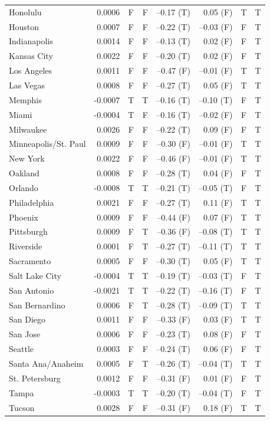\documentclass[
  12pt,
]{interact}
\begin{document}
\begin{table}
{{\begin{tabular}{lrccrrcc}
Honolulu & 0.0006 & F & F & --0.17 (T) & 0.05 (F) & T & T\\
Houston & 0.0007 & F & F & --0.22 (T) & --0.03 (F) & F & T\\
Indianapolis & 0.0014 & F & F & --0.13 (T) & 0.02 (F) & F & T\\
\addlinespace
Kansas City & 0.0022 & F & F & --0.20 (T) & 0.02 (F) & F & T\\
Los Angeles & 0.0011 & F & F & --0.47 (F) & --0.01 (F) & T & T\\
Las Vegas & 0.0008 & F & F & --0.27 (T) & 0.05 (F) & T & T\\
Memphis & -0.0007 & T & T & --0.16 (T) & --0.10 (T) & F & T\\
Miami & -0.0004 & T & F & --0.16 (T) & --0.02 (F) & F & T\\
\addlinespace
Milwaukee & 0.0026 & F & F & --0.22 (T) & 0.09 (F) & F & T\\
Minneapolis/St. Paul & 0.0009 & F & F & --0.30 (F) & --0.01 (F) & T & T\\
New York & 0.0022 & F & F & --0.46 (F) & --0.01 (F) & T & T\\
Oakland & 0.0008 & F & F & --0.28 (T) & 0.04 (F) & F & T\\
Orlando & -0.0008 & T & T & --0.21 (T) & --0.05 (T) & F & T\\
\addlinespace
Philadelphia & 0.0021 & F & F & --0.27 (T) & 0.11 (F) & T & T\\
Phoenix & 0.0009 & F & F & --0.44 (F) & 0.07 (F) & T & T\\
Pittsburgh & 0.0009 & F & T & --0.36 (F) & --0.08 (T) & T & T\\
Riverside & 0.0001 & F & T & --0.27 (T) & --0.11 (T) & T & T\\
Sacramento & 0.0005 & F & F & --0.30 (T) & 0.05 (F) & T & T\\
\addlinespace
Salt Lake City & -0.0004 & T & T & --0.19 (T) & --0.03 (T) & F & T\\
San Antonio & -0.0021 & T & T & --0.22 (T) & --0.16 (T) & F & T\\
San Bernardino & 0.0006 & F & T & --0.28 (T) & --0.09 (T) & T & T\\
San Diego & 0.0011 & F & F & --0.33 (F) & 0.03 (F) & T & T\\
San Jose & 0.0006 & F & F & --0.23 (T) & 0.08 (F) & F & T\\
\addlinespace
Seattle & 0.0003 & F & F & --0.24 (T) & 0.06 (F) & F & T\\
Santa Ana/Anaheim & 0.0005 & F & T & --0.26 (T) & --0.04 (T) & T & T\\
St. Petersburg & 0.0012 & F & F & --0.31 (F) & 0.01 (F) & F & T\\
Tampa & -0.0003 & T & T & --0.20 (T) & --0.04 (T) & F & T\\
Tucson & 0.0028 & F & F & --0.31 (F) & 0.18 (F) & T & T\\
\bottomrule
\end{tabular}}

}

\end{table}%
\end{document}
